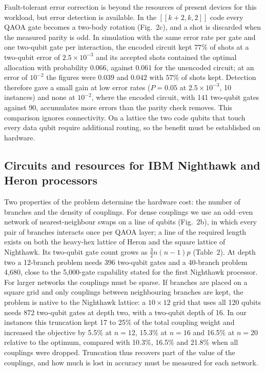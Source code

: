 \documentclass[12pt,a4paper]{article}
\begin{document}
Fault-tolerant error correction is beyond the resources of present devices for this workload, but error detection is available. In the $[[k+2,k,2]]$ code\cite{self2024} every QAOA gate becomes a two-body rotation (Fig.~2c), and a shot is discarded when the measured parity is odd. In simulation with the same error rate per gate and one two-qubit gate per interaction, the encoded circuit kept $77$\% of shots at a two-qubit error of $2.5\times10^{-3}$ and its accepted shots contained the optimal allocation with probability $0.066$, against $0.061$ for the unencoded circuit; at an error of $10^{-2}$ the figures were $0.039$ and $0.042$ with $57$\% of shots kept. Detection therefore gave a small gain at low error rates ($P=0.05$ at $2.5\times10^{-3}$, 10 instances) and none at $10^{-2}$, where the encoded circuit, with 141 two-qubit gates against 90, accumulates more errors than the parity check removes. This comparison ignores connectivity. On a lattice the two code qubits that touch every data qubit require additional routing, so the benefit must be established on hardware.

\subsection*{Circuits and resources for IBM Nighthawk and Heron processors}

Two properties of the problem determine the hardware cost: the number of branches and the density of couplings. For dense couplings we use an odd--even network of nearest-neighbour swaps on a line of qubits (Fig.~2b), in which every pair of branches interacts once per QAOA layer\cite{weidenfeller2022}; a line of the required length exists on both the heavy-hex lattice of Heron and the square lattice of Nighthawk. Its two-qubit gate count grows as $\tfrac{3}{2}n(n-1)p$ (Table~2). At depth two a 12-branch problem needs 396 two-qubit gates and a 40-branch problem 4,680, close to the 5,000-gate capability stated for the first Nighthawk processor\cite{ibm2026}. For larger networks the couplings must be sparse. If branches are placed on a square grid and only couplings between neighbouring branches are kept, the problem is native to the Nighthawk lattice: a $10\times12$ grid that uses all 120 qubits needs 872 two-qubit gates at depth two, with a two-qubit depth of 16. In our instances this truncation kept 17 to 25\% of the total coupling weight and increased the objective by 5.5\% at $n=12$, 15.3\% at $n=16$ and 16.5\% at $n=20$ relative to the optimum, compared with 10.3\%, 16.5\% and 21.8\% when all couplings were dropped. Truncation thus recovers part of the value of the couplings, and how much is lost in accuracy must be measured for each network.
\end{document}
